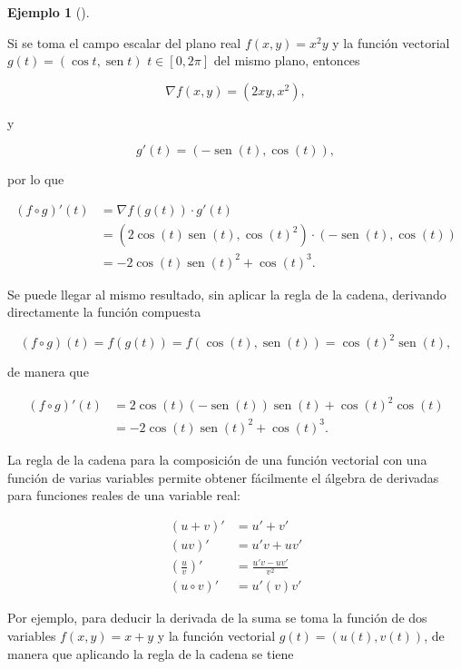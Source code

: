 \documentclass[
  a4paper,
]{scrreport}
\theoremstyle{plain}
\theoremstyle{plain}
\theoremstyle{definition}
\theoremstyle{definition}
\newtheorem{example}{Ejemplo}[chapter]
\theoremstyle{plain}
\theoremstyle{definition}
\theoremstyle{remark}
\begin{document}
\begin{example}[]\protect\hypertarget{exm-regla-cadena}{}\label{exm-regla-cadena}

Si se toma el campo escalar del plano real \(f(x,y)=x^2y\) y la función
vectorial \(g(t)=(\cos t,\operatorname{sen} t)\) \(t\in [0,2\pi]\) del
mismo plano, entonces

\[
\nabla f(x,y) = (2xy, x^2),
\]

y

\[
g'(t) = (-\operatorname{sen}(t), \cos(t)),
\]

por lo que

\begin{align*}
(f\circ g)'(t) 
&= \nabla f(g(t))\cdot g'(t) \\
&= (2\cos(t)\operatorname{sen}(t),\cos(t)^2)\cdot (-\operatorname{sen}(t),\cos(t)) \\
&= -2\cos(t)\operatorname{sen}(t)^2+\cos(t)^3.
\end{align*}

Se puede llegar al mismo resultado, sin aplicar la regla de la cadena,
derivando directamente la función compuesta

\[
(f\circ g)(t) = f(g(t)) = f(\cos(t), \operatorname{sen}(t)) = \cos(t)^2\operatorname{sen}(t),
\]

de manera que

\begin{align*}
(f\circ g)'(t) 
&= 2\cos(t)(-\operatorname{sen}(t))\operatorname{sen}(t)+\cos(t)^2 \cos(t)\\
&= -2\cos(t)\operatorname{sen}(t)^2+\cos(t)^3.
\end{align*}

\end{example}

La regla de la cadena para la composición de una función vectorial con
una función de varias variables permite obtener fácilmente el álgebra de
derivadas para funciones reales de una variable real:

\[
\begin{aligned}
(u+v)' &= u'+v'\\
(uv)' &= u'v+uv'\\
\left(\frac{u}{v}\right)' &= \frac{u'v-uv'}{v^2}\\
(u\circ v)' &= u'(v)v'
\end{aligned}
\]

Por ejemplo, para deducir la derivada de la suma se toma la función de
dos variables \(f(x,y)=x+y\) y la función vectorial
\(g(t)=(u(t),v(t))\), de manera que aplicando la regla de la cadena se
tiene
\end{document}
